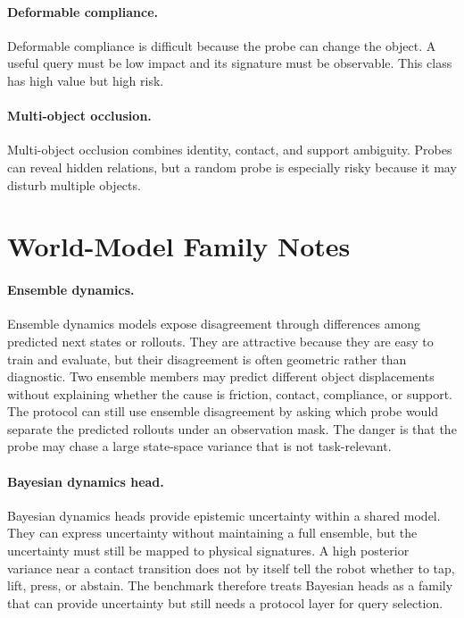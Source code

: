 \documentclass{article}
\begin{document}
\paragraph{Deformable compliance.}
Deformable compliance is difficult because the probe can change the object. A useful query must be low impact and its signature must be observable. This class has high value but high risk.

\paragraph{Multi-object occlusion.}
Multi-object occlusion combines identity, contact, and support ambiguity. Probes can reveal hidden relations, but a random probe is especially risky because it may disturb multiple objects.

\section{World-Model Family Notes}

\paragraph{Ensemble dynamics.}
Ensemble dynamics models expose disagreement through differences among predicted next states or rollouts. They are attractive because they are easy to train and evaluate, but their disagreement is often geometric rather than diagnostic. Two ensemble members may predict different object displacements without explaining whether the cause is friction, contact, compliance, or support. The protocol can still use ensemble disagreement by asking which probe would separate the predicted rollouts under an observation mask. The danger is that the probe may chase a large state-space variance that is not task-relevant.

\paragraph{Bayesian dynamics head.}
Bayesian dynamics heads provide epistemic uncertainty within a shared model. They can express uncertainty without maintaining a full ensemble, but the uncertainty must still be mapped to physical signatures. A high posterior variance near a contact transition does not by itself tell the robot whether to tap, lift, press, or abstain. The benchmark therefore treats Bayesian heads as a family that can provide uncertainty but still needs a protocol layer for query selection.
\end{document}
